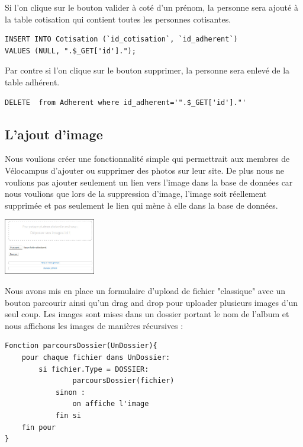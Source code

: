\documentclass[11pt,a4paper,titlepage]{report}
\begin{document}
Si l'on clique sur le bouton valider à coté d'un prénom, la personne sera ajouté à la table cotisation qui contient toutes les personnes cotisantes.
\begin{verbatim}
INSERT INTO Cotisation (`id_cotisation`, `id_adherent`)
VALUES (NULL, ".$_GET['id'].");
\end{verbatim} 
Par contre si l'on clique sur le bouton supprimer, la personne sera enlevé de la table adhérent.
\begin{verbatim}
DELETE  from Adherent where id_adherent='".$_GET['id']."'
\end{verbatim}

\subsection{L'ajout d'image}
Nous voulions créer une fonctionnalité simple qui permettrait aux membres de Vélocampus d'ajouter ou supprimer des photos sur leur site. De plus nous ne voulions pas ajouter seulement un lien vers l'image dans la base de données car nous voulions que lors de la suppression d'image, l'image soit réellement supprimée et pas seulement le lien qui mène à elle dans la base de données.
\begin{center}
\includegraphics[width=0.3\textwidth]{addImage.jpg}~
\end{center}

Nous avons mis en place un formulaire d'upload de fichier "classique" avec un bouton parcourir ainsi qu'un drag and drop pour uploader plusieurs images d'un seul coup.
Les images sont mises dans un dossier portant le nom de l'album et nous affichons les images de manières récursives :
\begin{verbatim}
Fonction parcoursDossier(UnDossier){
    pour chaque fichier dans UnDossier:
        si fichier.Type = DOSSIER:
        	    parcoursDossier(fichier)
        	sinon : 
        	    on affiche l'image
        	fin si
    fin pour
}
\end{verbatim}
 
\end{document}
